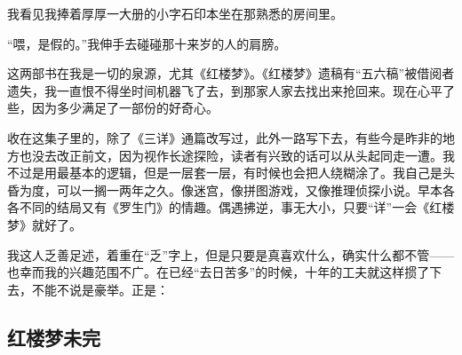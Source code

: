\par 我看见我捧着厚厚一大册的小字石印本坐在那熟悉的房间里。
\par “喂，是假的。”我伸手去碰碰那十来岁的人的肩膀。
\par 这两部书在我是一切的泉源，尤其《红楼梦》。《红楼梦》遗稿有“五六稿”被借阅者遗失，我一直恨不得坐时间机器飞了去，到那家人家去找出来抢回来。现在心平了些，因为多少满足了一部份的好奇心。
\par 收在这集子里的，除了《三详》通篇改写过，此外一路写下去，有些今是昨非的地方也没去改正前文，因为视作长途探险，读者有兴致的话可以从头起同走一遭。我不过是用最基本的逻辑，但是一层套一层，有时候也会把人绕糊涂了。我自己是头昏为度，可以一搁一两年之久。像迷宫，像拼图游戏，又像推理侦探小说。早本各各不同的结局又有《罗生门》的情趣。偶遇拂逆，事无大小，只要“详”一会《红楼梦》就好了。
\par 我这人乏善足述，着重在“乏”字上，但是只要是真喜欢什么，确实什么都不管——也幸而我的兴趣范围不广。在已经“去日苦多”的时候，十年的工夫就这样掼了下去，不能不说是豪举。正是：




\subsection{红楼梦未完}


